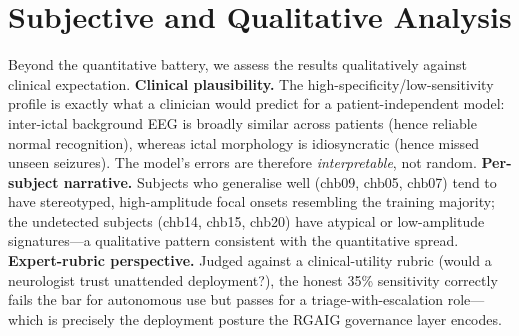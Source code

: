 \documentclass[10pt,journal,twocolumn]{IEEEtran}
\begin{document}
\section{Subjective and Qualitative Analysis}
Beyond the quantitative battery, we assess the results qualitatively against clinical expectation. \textbf{Clinical plausibility.} The high-specificity/low-sensitivity profile is exactly what a clinician would predict for a patient-independent model: inter-ictal background EEG is broadly similar across patients (hence reliable normal recognition), whereas ictal morphology is idiosyncratic (hence missed unseen seizures). The model's errors are therefore \emph{interpretable}, not random. \textbf{Per-subject narrative.} Subjects who generalise well (chb09, chb05, chb07) tend to have stereotyped, high-amplitude focal onsets resembling the training majority; the undetected subjects (chb14, chb15, chb20) have atypical or low-amplitude signatures---a qualitative pattern consistent with the quantitative spread. \textbf{Expert-rubric perspective.} Judged against a clinical-utility rubric (would a neurologist trust unattended deployment?), the honest 35\% sensitivity correctly fails the bar for autonomous use but passes for a triage-with-escalation role---which is precisely the deployment posture the RGAIG governance layer encodes.
\end{document}
